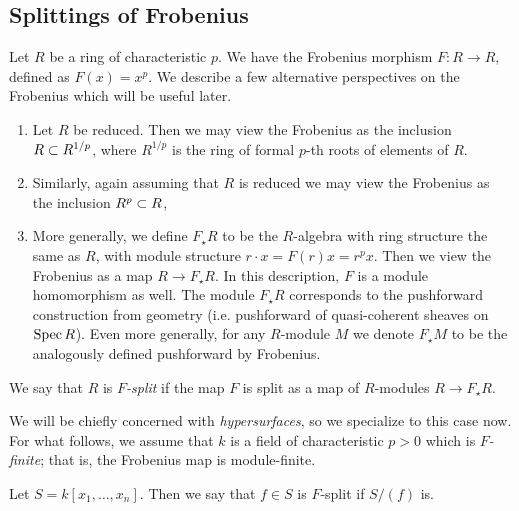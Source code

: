 \subsection{Splittings of Frobenius}

Let \(R\) be a ring of characteristic \(p\). 
We have the Frobenius morphism 
\(F \colon R \xrightarrow{} R\), 
defined as \(F(x) = x^p\).
We describe a few alternative perspectives on
the Frobenius which will be useful later.

\begin{rmk}
	\label{rmk:frob:perspectives}
    \hfill
    \begin{enumerate}[(1)]
    	\item Let \(R\) be reduced. 
    		Then we may view the Frobenius as the inclusion
    		\(R \subset R^{1 / p}\), where \(R^{1 / p}\) 
    		is the ring of formal \(p\)-th roots of elements
    		of \(R\).
    	\item Similarly, again assuming that \(R\) is reduced
    		we may view the Frobenius as the inclusion
    		\(R^{p} \subset R\), 
    	\item More generally, we define \(F_{\star}R\) to
			be the \(R\)-algebra with ring structure 
			the same as \(R\), with module structure
			\(r \cdot x = F(r)x = r^{p}x\).
			Then we view the Frobenius as a map
			\(R \xrightarrow{} F_{\star}R\).
			In this description, \(F\) is a module 
			homomorphism as well. 
			The module \(F_{\star}R\) corresponds to the
			pushforward construction from geometry
			(i.e. pushforward of quasi-coherent
			sheaves on \(\operatorname{Spec} R\)).
			Even more generally, for any \(R\)-module
			\(M\) we denote \(F_{\star}M\) to be
			the analogously defined pushforward by
			Frobenius.
    \end{enumerate}
\end{rmk}

\begin{defn}
	We say that \(R\) is \textit{\(F\)-split} if the map \(F\) is
	split as a map of 
	\(R\)-modules \(R \xrightarrow{} F_{\star}R\).
\end{defn}

We will be chiefly concerned with \textit{hypersurfaces},
so we specialize to this case now.
For what follows, we assume that \(k\) is a field
of characteristic \(p > 0\) which is 
\textit{\(F\)-finite}; that is, the Frobenius
map is module-finite.

\begin{defn}
	Let \(S = k[x_{1}, \ldots, x_{n}]\).
	Then we say that \(f \in S\) is \(F\)-split if 
	\(S / (f)\) is.
\end{defn}

